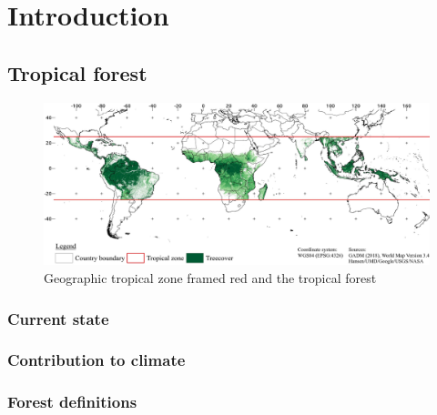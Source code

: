 \section{Introduction}
\label{sec:introduction}

\subsection{Tropical forest}
	\begin{figure}[h]
		\centering
		\includegraphics[scale=0.97]{img/intro_overview_frameless}
		\caption[Tropical zone]{Geographic tropical zone framed red and the tropical forest}
		\label{fig:tropicalzone}
	\end{figure}

	\subsubsection{Current state}
	\subsubsection{Contribution to climate}
	\subsubsection{Forest definitions}

